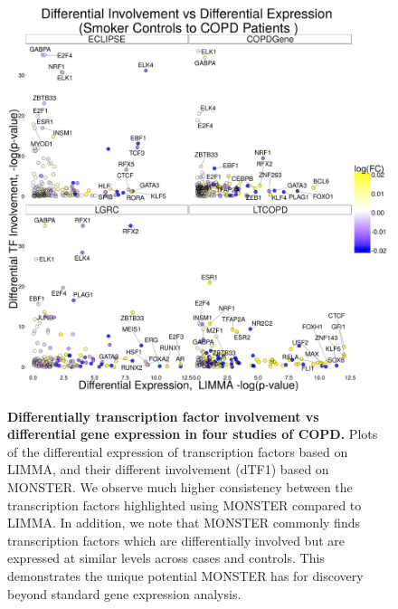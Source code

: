 \begin{figure}
\textbf{\includegraphics[width=1\linewidth]{figures/dTFIvsLIMMAall}
}\caption[Differentially transcription factor involvement vs differential gene expression in four studies of COPD]{\textbf{Differentially transcription factor involvement vs differential gene expression in four studies of COPD.}  Plots of the differential expression of transcription factors based on LIMMA, and their different involvement (dTF1) based on MONSTER. We observe much higher consistency between the transcription factors highlighted using MONSTER compared to LIMMA. In addition, we note that MONSTER commonly finds transcription factors which are differentially involved but are expressed at similar levels across cases and controls. This demonstrates the unique potential MONSTER has for discovery beyond standard gene expression analysis.}

\label{fig:sup_expression}
\end{figure}

